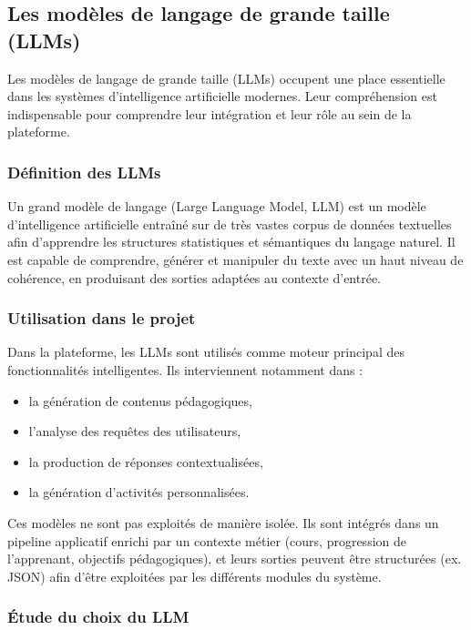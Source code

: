 \subsection{Les modèles de langage de grande taille (LLMs)}

Les modèles de langage de grande taille (LLMs) occupent une place essentielle dans les systèmes d'intelligence artificielle modernes. Leur compréhension est indispensable pour comprendre leur intégration et leur rôle au sein de la plateforme.

\subsubsection{Définition des LLMs}

Un grand modèle de langage \cite{cloudflare_llm} (Large Language Model, LLM) est un modèle d'intelligence artificielle entraîné sur de très vastes corpus de données textuelles afin d'apprendre les structures statistiques et sémantiques du langage naturel. Il est capable de comprendre, générer et manipuler du texte avec un haut niveau de cohérence, en produisant des sorties adaptées au contexte d'entrée.

\subsubsection{Utilisation dans le projet}

Dans la plateforme, les LLMs sont utilisés comme moteur principal des fonctionnalités intelligentes. Ils interviennent notamment dans :

\begin{itemize}
    \item la génération de contenus pédagogiques,
    \item l'analyse des requêtes des utilisateurs,
    \item la production de réponses contextualisées,
    \item la génération d'activités personnalisées.
\end{itemize}

Ces modèles ne sont pas exploités de manière isolée. Ils sont intégrés dans un pipeline applicatif enrichi par un contexte métier (cours, progression de l'apprenant, objectifs pédagogiques), et leurs sorties peuvent être structurées (ex. JSON) afin d'être exploitées par les différents modules du système.

\subsubsection{Étude du choix du LLM}

